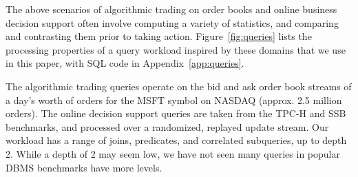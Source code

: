 \vspace{1mm}
The above scenarios of algorithmic trading on order books and online
business decision support often involve computing a variety of statistics,
and comparing and contrasting them prior to taking action.
Figure~\ref{fig:queries} lists the processing properties of a query workload
inspired by these domains that we use in this paper, with SQL code in
Appendix~\ref{app:queries}.

The algorithmic trading queries operate on the bid and ask order book streams of a day's
worth of orders for the MSFT symbol on NASDAQ (approx. 2.5 million orders). The
online decision support queries are taken from the TPC-H and SSB benchmarks, and
processed over a randomized, replayed update stream.
Our workload has a range of joins, predicates, and correlated
subqueries, up to depth 2. While a depth of 2 may seem low, we have not seen
many queries in popular DBMS benchmarks have more levels.

